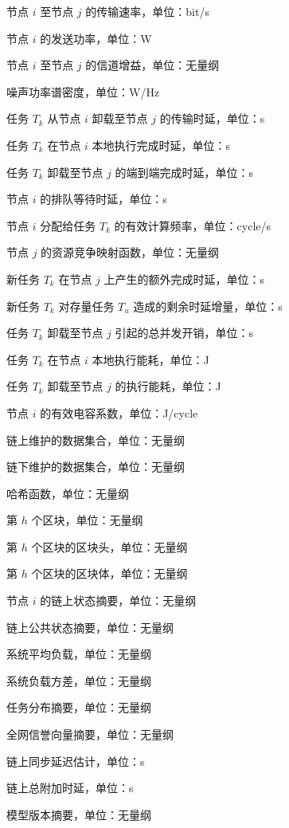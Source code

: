 \begin{symbols}
  \item[$R_{ij}(t)$] 节点 $i$ 至节点 $j$ 的传输速率，单位：bit/s
  \item[$P_i$] 节点 $i$ 的发送功率，单位：W
  \item[$h_{ij}(t)$] 节点 $i$ 至节点 $j$ 的信道增益，单位：无量纲
  \item[$N_0$] 噪声功率谱密度，单位：W/Hz
  \item[$D_{k,ij}^{\mathrm{tx}}(t)$] 任务 $T_k$ 从节点 $i$ 卸载至节点 $j$ 的传输时延，单位：s
  \item[$D_{k,i}^{\mathrm{loc}}(t)$] 任务 $T_k$ 在节点 $i$ 本地执行完成时延，单位：s
  \item[$D_{k,ij}^{\mathrm{off}}(t)$] 任务 $T_k$ 卸载至节点 $j$ 的端到端完成时延，单位：s
  \item[$W_i(t)$] 节点 $i$ 的排队等待时延，单位：s
  \item[$f_{k,i}^{\mathrm{alloc}}(t)$] 节点 $i$ 分配给任务 $T_k$ 的有效计算频率，单位：cycle/s
  \item[$g_j(\cdot)$] 节点 $j$ 的资源竞争映射函数，单位：无量纲
  \item[$\Delta_{k,j}^{\mathrm{new}}(t)$] 新任务 $T_k$ 在节点 $j$ 上产生的额外完成时延，单位：s
  \item[$\Delta_{u|k,j}^{\mathrm{rem}}(t)$] 新任务 $T_k$ 对存量任务 $T_u$ 造成的剩余时延增量，单位：s
  \item[$CO_{k,j}(t)$] 任务 $T_k$ 卸载至节点 $j$ 引起的总并发开销，单位：s
  \item[$E_{k,i}^{\mathrm{loc}}(t)$] 任务 $T_k$ 在节点 $i$ 本地执行能耗，单位：J
  \item[$E_{k,ij}^{\mathrm{off}}(t)$] 任务 $T_k$ 卸载至节点 $j$ 的执行能耗，单位：J
  \item[$\kappa_i$] 节点 $i$ 的有效电容系数，单位：J/cycle

  \item[$\mathcal{D}_{\mathrm{on}}$] 链上维护的数据集合，单位：无量纲
  \item[$\mathcal{D}_{\mathrm{off}}$] 链下维护的数据集合，单位：无量纲
  \item[$H(\cdot)$] 哈希函数，单位：无量纲
  \item[$B^h$] 第 $h$ 个区块，单位：无量纲
  \item[$\mathrm{Header}^h$] 第 $h$ 个区块的区块头，单位：无量纲
  \item[$\mathrm{Body}^h$] 第 $h$ 个区块的区块体，单位：无量纲
  \item[$\Sigma_i(t)$] 节点 $i$ 的链上状态摘要，单位：无量纲
  \item[$G(t)$] 链上公共状态摘要，单位：无量纲
  \item[$\bar{L}(t)$] 系统平均负载，单位：无量纲
  \item[$\sigma_L^2(t)$] 系统负载方差，单位：无量纲
  \item[$D^{\mathrm{task}}(t)$] 任务分布摘要，单位：无量纲
  \item[$R^{\mathrm{rep}}(t)$] 全网信誉向量摘要，单位：无量纲
  \item[$\hat{D}_{\mathrm{chain}}(t)$] 链上同步延迟估计，单位：s
  \item[$D_{\mathrm{chain}}(t)$] 链上总附加时延，单位：s
  \item[$M(t)$] 模型版本摘要，单位：无量纲


\end{symbols}
